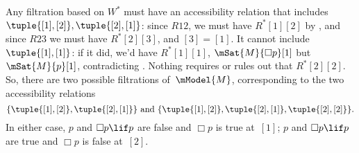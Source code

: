 \documentclass[../../../include/open-logic-section]{subfiles}
\begin{document}
\begin{ex}
  Any filtration based on $W^*$ must have an accessibility relation
  that includes $\tuple{[1], [2]}, \tuple{[2],[1]}$: since $R12$, we
  must have $R^*[1][2]$ by
  , and
  since $R23$ we must have $R^*[2][3]$, and $[3]=[1]$. It cannot
  include $\tuple{[1],[1]}$: if it did, we'd have $R^*[1][1]$,
  $\mSat{M}{\Box p}[1]$ but $\mSat{M}{p}[1]$, contradicting
  . Nothing requires or rules out that
  $R^*[2][2]$. So, there are two possible filtrations of~$\mModel{M}$,
  corresponding to the two accessibility relations
  \[
  \{\tuple{[1],[2]}, \tuple{[2],[1]}\} \text{ and }
  \{\tuple{[1],[2]}, \tuple{[2],[1]}, \tuple{[2],[2]}\}.
  \]
  In either case, $p$ and $\Box p \lif p$ are false and $\Box p$ is
  true at~$[1]$; $p$ and $\Box p \lif p$ are true and $\Box p$ is
  false at~$[2]$.
\end{ex}
\end{document}

